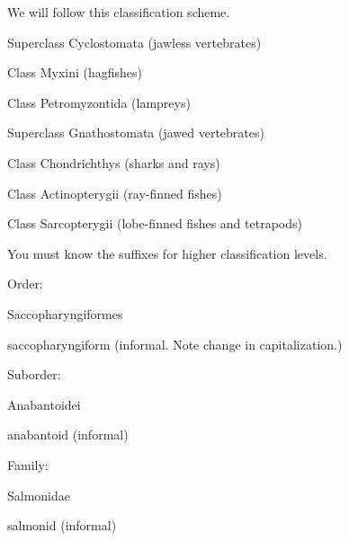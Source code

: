 \documentclass[t]{beamer}
\begin{document}
\begin{frame}[t,plain]{We will follow this classification scheme.}

	\hspace{5em} Superclass Cyclostomata (jawless vertebrates)

	\hspace{6em} Class Myxini (hagfishes)

	\hspace{6em} Class Petromyzontida (lampreys)

	\hspace{5em} Superclass Gnathostomata (jawed vertebrates)

	\hspace{6em} Class Chondrichthys (sharks and rays)

	\hspace{6em} Class Actinopterygii (ray-finned fishes)

	\hspace{6em} Class Sarcopterygii (lobe-finned fishes and tetrapods)
	
\end{frame}

\begin{frame}[t,plain]{You must know the suffixes for higher classification levels.}

	\hangpara Order: 
	
	\hspace{2em} Saccopharyngiformes
	
	\hspace{2em} saccopharyngiform (informal. Note change in capitalization.)

	\hangpara Suborder: 
	
	\hspace{2em} Anabantoidei
	
	\hspace{2em} anabantoid (informal)
	
	\hangpara Family: 
	
	\hspace{2em} Salmonidae
	
	\hspace{2em} salmonid (informal)
	
\end{frame}
\end{document}
